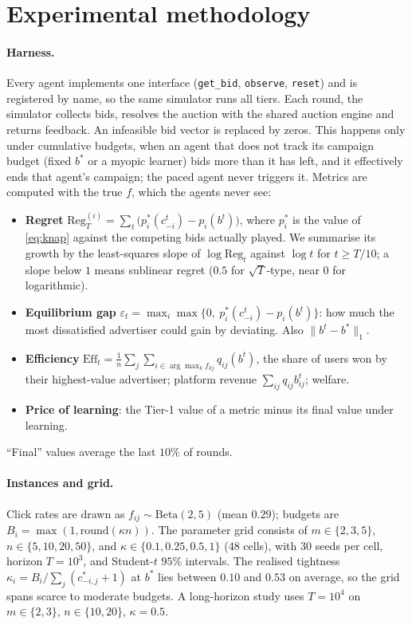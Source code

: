 \documentclass[11pt]{article}
\theoremstyle{remark}
\newcommand{\Reg}{\mathrm{Reg}}
\newcommand{\Eff}{\mathrm{Eff}}
\begin{document}
\section{Experimental methodology}\label{sec:method}
\paragraph{Harness.} Every agent implements one interface (\texttt{get\_bid}, \texttt{observe},
\texttt{reset}) and is registered by name, so the same simulator runs all tiers. Each round, the
simulator collects bids, resolves the auction with the shared auction engine and returns feedback. An
infeasible bid vector is replaced by zeros. This happens only under cumulative budgets, when an agent
that does not track its campaign budget (fixed $b^*$ or a myopic learner) bids more than it has left,
and it effectively ends that agent's campaign; the paced agent never triggers it. Metrics are computed with the true
$f$, which the agents never see:
\begin{itemize}
  \item \textbf{Regret} $\Reg^{(i)}_T=\sum_t\big(p_i^*(c^t_{-i})-p_i(b^t)\big)$, where $p_i^*$ is the
        value of \eqref{eq:knap} against the competing bids actually played. We summarise its growth by the
        least-squares slope of $\log\Reg_t$ against $\log t$ for $t\ge T/10$; a slope below $1$ means
        sublinear regret ($0.5$ for $\sqrt T$-type, near $0$ for logarithmic).
  \item \textbf{Equilibrium gap} $\varepsilon_t=\max_i \max\{0,\ p_i^*(c^t_{-i})-p_i(b^t)\}$: how
        much the most dissatisfied advertiser could gain by deviating. Also $\|b^t-b^*\|_1$.
  \item \textbf{Efficiency} $\Eff_t=\frac1n\sum_j\sum_{i\in\arg\max_k f_{kj}}q_{ij}(b^t)$, the share of
        users won by their highest-value advertiser; platform revenue $\sum_{ij}q_{ij}b^t_{ij}$; welfare.
  \item \textbf{Price of learning}: the Tier-1 value of a metric minus its final value under learning.
\end{itemize}
``Final'' values average the last $10\%$ of rounds.

\paragraph{Instances and grid.} Click rates are drawn as $f_{ij}\sim\mathrm{Beta}(2,5)$ (mean $0.29$);
budgets are $B_i=\max(1,\mathrm{round}(\kappa n))$. The parameter grid consists of
$m\in\{2,3,5\}$, $n\in\{5,10,20,50\}$, and $\kappa\in\{0.1,0.25,0.5,1\}$ ($48$ cells), with
$30$ seeds per cell, horizon $T=10^3$, and Student-$t$ $95\%$ intervals. The realised tightness
$\kappa_i=B_i/\sum_j(c^*_{-i,j}+1)$ at $b^*$ lies between $0.10$ and $0.53$ on average, so the grid
spans scarce to moderate budgets. A long-horizon study uses $T=10^4$ on $m\in\{2,3\}$, $n\in\{10,20\}$,
$\kappa=0.5$.
\end{document}
